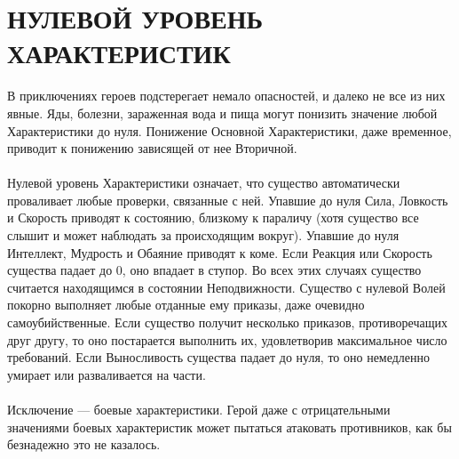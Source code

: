 \section{НУЛЕВОЙ УРОВЕНЬ ХАРАКТЕРИСТИК}
В приключениях героев подстерегает немало опасностей, и далеко не все из них явные. Яды, болезни, зараженная вода и пища могут понизить значение любой Характеристики до нуля. Понижение Основной Характеристики, даже временное, приводит к понижению зависящей от нее Вторичной.
\paragraph{}
Нулевой уровень Характеристики означает, что существо автоматически проваливает любые проверки, связанные с ней. Упавшие до нуля Сила, Ловкость и Скорость приводят к состоянию, близкому к параличу (хотя существо все слышит и может наблюдать за происходящим вокруг). Упавшие до нуля Интеллект, Мудрость и Обаяние приводят к коме. Если Реакция или Скорость существа падает до 0, оно впадает в ступор. Во всех этих случаях существо считается находящимся в состоянии Неподвижности. Существо с нулевой Волей покорно выполняет любые отданные ему приказы, даже очевидно самоубийственные. Если существо получит несколько приказов, противоречащих друг другу, то оно постарается выполнить их, удовлетворив максимальное число требований. Если Выносливость существа падает до нуля, то оно немедленно умирает или разваливается на части.
\paragraph{}
Исключение — боевые характеристики. Герой даже с отрицательными значениями боевых характеристик может пытаться атаковать противников, как бы безнадежно это не казалось.